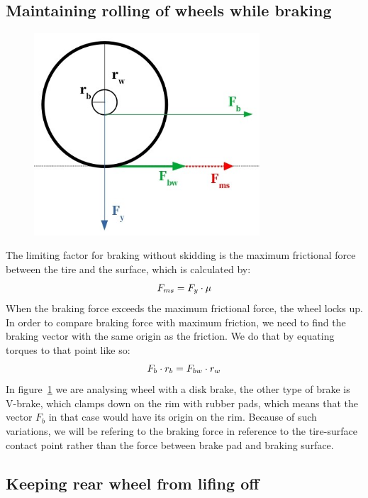\documentclass[12pt]{article}
\begin{document}
\subsection{Maintaining rolling of wheels while braking}
\begin{figure}[H]
\caption{}
\includegraphics[width=0.75\textwidth]{wheel_braking_forces}%
\label{fig:wheel_diagram_1}
\end{figure}
The limiting factor for braking without skidding is the maximum frictional force between the tire and the 
surface, which is calculated by:
\begin{equation}
\centering%
\label{eq:F_ms}
F_{ms} = F_y \cdot \mu
\end{equation}
When the braking force exceeds the maximum frictional force, the wheel locks up. In order to compare braking 
force with maximum friction, we need to find the braking vector with the same origin as the friction. We do 
that by equating torques to that point like so:
\begin{equation}
\centering%
\label{eq:F_bw}
F_b \cdot r_b = F_{bw} \cdot r_w
\end{equation}
In figure~\ref{fig:wheel_diagram_1} we are analysing wheel with a disk brake, the other type of brake is 
V-brake, which clamps down on the rim with rubber pads, which means that the vector $F_b$ in that case would 
have its origin on the rim. Because of such variations, we will be refering to the braking force in reference 
to the tire-surface contact point rather than the force between brake pad and braking surface.

\subsection{Keeping rear wheel from lifing off}
\end{document}
